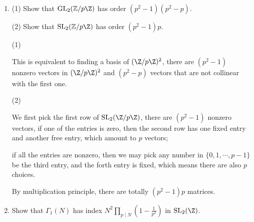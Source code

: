 \begin{enumerate}
\begin{proofc}[解答]
    For the matrix $\begin{bmatrix}
        h & 0 \\
        0 & r
    \end{bmatrix}$, we assume $hr = tN+1$, and uncertain $\begin{bmatrix}
        h+h'N & fN \\
        gN & r + r'N
    \end{bmatrix}$, then we need $(h+h'N)(r+r'N) - gfN^2 = 1$.

    Equivalently, 
    $$N(h'r+r'h + N(h'r'-gf)) = -tN.$$
    
    Then because $\gcd(r, N) = \gcd(h, N) = 1$, we may find $h', r'\in \mathbb{Z}$ with $h'r + r'h + t \equiv 0 \ (\mathrm{mod} \ N)$.
    then pick $g, f\in \mathbb{Z}$, we have done!


\end{proofc}


\item 

(1) Show that $\mathrm{GL}_2(\mathbb{Z} / p\Z)$ has order $(p^2 - 1)(p^2 - p)$.

(2) Show that $\mathrm{SL}_2(\mathbb{Z} / p\Z)$ has order $(p^2 - 1)p$.

\begin{proofc}[解答]
(1)

This is equivalent to finding a basis of $(\Z/p\Z) ^2$, there are $(p^2-1)$ nonzero vectors in $(\Z/p\Z) ^2$ and $(p^2 - p)$ vectors that are not collinear with the first one.

(2)

We first pick the first row of $\mathrm{SL}_2(\Z/p\Z)$, there are $(p^2-1)$ nonzero vectors, 
if one of the entries is zero, then the second row has one fixed entry and another free entry, which amount to $p$ vectors;

if all the entries are nonzero, then we may pick any number in $\{0, 1, \cdots, p-1\}$ be the third entry, and the forth entry is fixed, which means there are also $p$ choices.

By multiplication principle, there are totally $(p^2-1)p$ matrices.

\end{proofc}



\item Show that $\Gamma_1(N)$ has index $\displaystyle N^2 \prod_{p \mid N} (1-\frac{1}{p^2})$ in $\mathrm{SL}_2(\Z)$.

\begin{proofc}[解答]
    

\end{proofc}
\end{enumerate}
